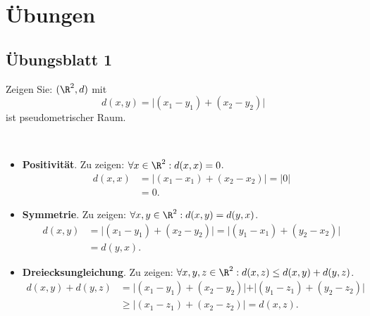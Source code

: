 \chapter{Übungen}



% 
\section{Übungsblatt 1}
\setcounter{problemcounter}{0}

\begin{assignment}
  Zeigen Sie: \( (\R^2, d) \) mit
  \begin{equation*}
    d(x,y) = \vert (x_1-y_1)+(x_2-y_2) \vert
  \end{equation*}
  ist pseudometrischer Raum.
\end{assignment}
\begin{solution}
  \
  \begin{itemize}
    \item \textbf{Positivität}. Zu zeigen: \( \forall x \in \R^2: d(x,x) = 0 \).
    \begin{align*}
      d(x,x) &= \vert (x_1-x_1)+(x_2-x_2) \vert = \vert 0 \vert \\
      &= 0\text{.}
    \end{align*}
    
    \item \textbf{Symmetrie}. Zu zeigen: \( \forall x, y \in \R^2: d(x,y) = d(y,x) \).
    \begin{align*}
      d(x,y) &= \vert (x_1-y_1)+(x_2-y_2) \vert = \vert (y_1-x_1)+(y_2-x_2) \vert \\
      &= d(y,x)\text{.}
    \end{align*}
    
    \item \textbf{Dreiecksungleichung}. Zu zeigen: \( \forall x,y,z \in \R^2: d(x,z) \leq d(x,y) + d(y,z) \).
    \begin{align*}
      d(x,y) + d(y,z) &= \vert (x_1-y_1)+(x_2-y_2) \vert + \vert (y_1-z_1)+(y_2-z_2) \vert \\
      &\geq \vert (x_1-z_1) + (x_2 - z_2) \vert = d(x,z)\text{.}
    \end{align*}
  \end{itemize}
\end{solution}

